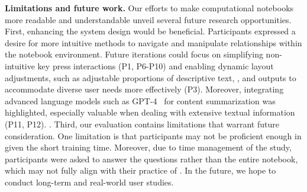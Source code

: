 \textbf{Limitations and future work.}
Our efforts to make computational notebooks more readable and understandable unveil several future research opportunities.
First, enhancing the system design would be beneficial. 
Participants expressed a desire for more intuitive methods to navigate and manipulate relationships within the notebook environment. 
Future iterations could focus on simplifying non-intuitive key press interactions (P1, P6-P10) and enabling dynamic layout adjustments, such as adjustable proportions of descriptive text, , and outputs to accommodate diverse user needs more effectively (P3).
Moreover, integrating advanced language models such as GPT-4~\cite{openai2023gpt4} for content summarization was highlighted, especially valuable when dealing with extensive textual information (P11, P12). 
.
Third, our evaluation contains limitations that warrant future consideration.
One limitation is that participants may not be proficient enough in \tool given the short training time.
Moreover, due to time management of the study, participants were asked to answer the questions rather than  the entire notebook, which may not fully align with their practice of  .
In the future, we hope to conduct long-term and real-world user studies.